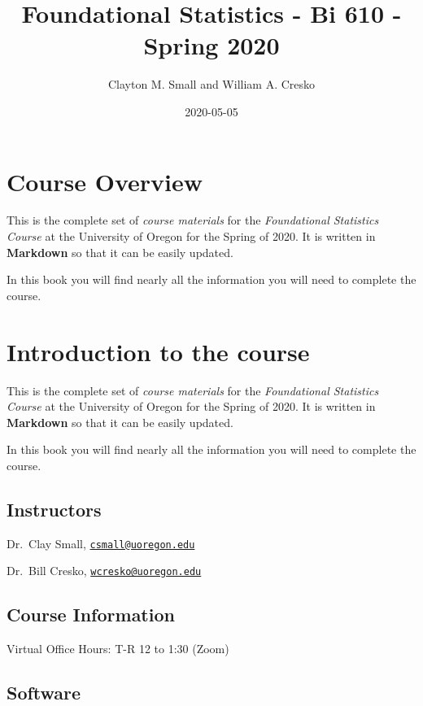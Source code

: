 \documentclass[]{book}
\title{Foundational Statistics - Bi 610 - Spring 2020}
\author{Clayton M. Small and William A. Cresko}
\date{2020-05-05}
\begin{document}
\maketitle

{
\setcounter{tocdepth}{1}
\tableofcontents
}
\hypertarget{course-overview}{%
\chapter{Course Overview}\label{course-overview}}

This is the complete set of \emph{course materials} for the \emph{Foundational Statistics Course} at the University of Oregon for the Spring of 2020. It is written in \textbf{Markdown} so that it can be easily updated.

In this book you will find nearly all the information you will need to complete the course.

\hypertarget{introduction-to-the-course}{%
\chapter{Introduction to the course}\label{introduction-to-the-course}}

This is the complete set of \emph{course materials} for the \emph{Foundational Statistics Course} at the University of Oregon for the Spring of 2020. It is written in \textbf{Markdown} so that it can be easily updated.

In this book you will find nearly all the information you will need to complete the course.

\hypertarget{instructors}{%
\section{Instructors}\label{instructors}}

Dr.~Clay Small, \href{mailto:csmall@uoregon.edu}{\nolinkurl{csmall@uoregon.edu}}

Dr.~Bill Cresko, \href{mailto:wcresko@uoregon.edu}{\nolinkurl{wcresko@uoregon.edu}}

\hypertarget{course-information}{%
\section{Course Information}\label{course-information}}

Virtual Office Hours: T-R 12 to 1:30 (Zoom)

\hypertarget{software}{%
\section{Software}\label{software}}
\end{document}
